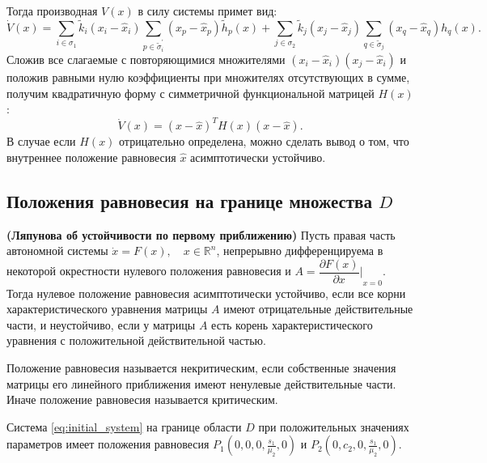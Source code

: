 \documentclass[14pt,a4paper]{extarticle}
\begin{document}
	Тогда производная $V(x)$ в силу системы примет вид:
	\[\dot{V}(x)=\sum\limits_{i\in\sigma_1}\tilde{k}_i(x_i-\hat{x}_i)\sum\limits_{p\in\tilde{\sigma}^\prime_i}(x_p-\hat{x}_p)\tilde{h}_{p}(x)+\sum\limits_{j\in\sigma_2}\tilde{k}_j(x_j-\hat{x}_j)\sum\limits_{q\in\tilde{\sigma}_j}(x_q-\hat{x}_q)h_{q}(x).\]
	Сложив все слагаемые с повторяющимися множителями $(x_i-\hat{x}_i)(x_j-\hat{x}_i)$ и положив равными нулю коэффициенты при множителях отсутствующих в сумме, получим квадратичную форму с симметричной функциональной матрицей $H(x)$:
	\[\dot{V}(x)=(x-\hat{x})^{T}H(x)(x-\hat{x}).\]
	В случае если $H(x)$ отрицательно определена, можно сделать вывод о том, что внутреннее положение равновесия $\hat{x}$ асимптотически устойчиво. 

	\subsection{Положения равновесия на границе множества $D$}
	
	\begin{theorem}\textbf{(Ляпунова об устойчивости по первому приближению)}
		Пусть правая часть автономной системы $\dot{x} = F(x),\quad x\in\mathbb{R}^n$, непрерывно дифференцируема в некоторой окрестности нулевого положения равновесия и $A = {\dfrac{\partial F(x)}{\partial x}\biggr\rvert}_{x=0}$. Тогда нулевое положение равновесия асимптотически устойчиво, если все корни характеристического уравнения матрицы $A$ имеют отрицательные действительные части, и неустойчиво, если у матрицы $A$ есть корень характеристического уравнения с положительной действительной частью.
	\end{theorem}
	
	\begin{definition}
		Положение равновесия называется некритическим, если собственные значения матрицы его линейного приближения имеют ненулевые действительные части. Иначе положение равновесия называется критическим. 
	\end{definition}
	
	\begin{theorem}\label{th:border_eqpoints}
		Система \ref{eq:initial_system} на границе области $D$ при положительных значениях параметров имеет положения равновесия $P_1\left(0,0,0,\frac{s_1}{\mu_2},0\right)$ и $P_2\left(0,c_2,0,\frac{s_1}{\mu_2},0\right)$. 
	\end{theorem}
	
\end{document}

